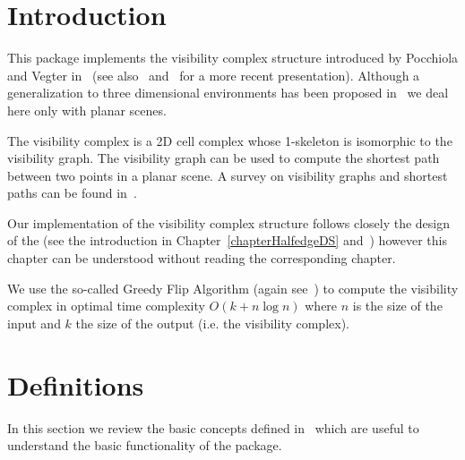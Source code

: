 
\ccParDims

\label{chapterVisibilityComplex}

\minitoc

\section{Introduction}
\label{sectionVComplexIntroduction}
This package implements the visibility complex structure introduced by Pocchiola
and Vegter in~\cite{pv-vc-96} (see also~\cite{pv-tsvcpt-96}
and~\cite{G-ap-sstvc-01} for a more recent presentation). Although a
generalization to three dimensional environments has been proposed
in~\cite{ddp-fahrgv-99} we deal here only with planar scenes. 

The visibility complex is a 2D cell complex whose 1-skeleton is isomorphic to
the visibility graph.  The visibility graph can be used to compute the shortest
path between two points in a planar scene. A survey on visibility graphs and
shortest paths can be found in~\cite{m-gspno-00}.

Our implementation of the visibility complex structure follows closely the
design of the  (see the introduction in
Chapter~\ref{chapterHalfedgeDS} and~\cite{k-ugpdd-99}) however this chapter can
be understood without reading the corresponding chapter.

We use the so-called Greedy Flip Algorithm (again see~\cite{pv-tsvcpt-96}) to
compute the visibility complex in optimal time complexity $O(k + n\log n)$ where
$n$ is the size of the input and $k$ the size of the output (i.e. the visibility
complex).
\section{Definitions}
In this section we review the basic concepts defined in~\cite{G-ap-sstvc-01}
which are useful to understand the basic functionality of the package.

